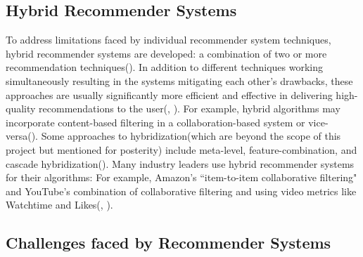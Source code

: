 \documentclass{l4proj}
\begin{document}
\subsection{Hybrid Recommender Systems}
To address limitations faced by individual recommender system techniques, hybrid recommender systems are developed: a combination of two or more recommendation techniques(\cite{Roy_Dutta_2022}). In addition to different techniques working simultaneously resulting in the systems mitigating each other's drawbacks, these approaches are usually significantly more efficient and effective in delivering high-quality recommendations to the user(\cite{Paul_Kundu_2019}, \cite{Roy_Dutta_2022}). For example, hybrid algorithms may incorporate content-based filtering in a collaboration-based system or vice-versa(\cite{Roy_Dutta_2022}). Some approaches to hybridization(which are beyond the scope of this project but mentioned for posterity) include meta-level, feature-combination, and cascade hybridization(\cite{Roy_Dutta_2022}). Many industry leaders use hybrid recommender systems for their algorithms: For example, Amazon's ``item-to-item collaborative filtering" and YouTube's combination of collaborative filtering and using video metrics like Watchtime and Likes(\cite{Hardesty_2024}, \cite{Goodrow_2021}).
\subsection{Challenges faced by Recommender Systems}
\end{document}
